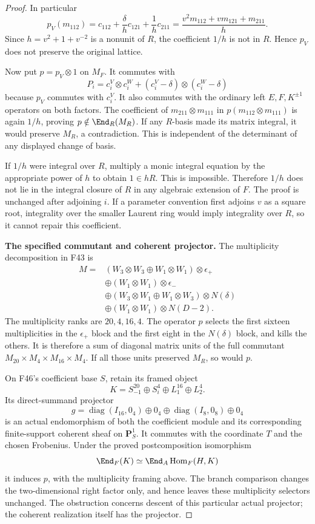 \documentclass[11pt,a4paper]{article}
\newcommand{\fid}[1]{\textsf{#1}}\newcommand{\gate}[1]{\textsf{#1}}
\theoremstyle{named}\newtheorem{finding}{Finding}[section]
\theoremstyle{definition}\newtheorem{definition}[finding]{Definition}
\theoremstyle{remark}\newtheorem{remark}[finding]{Remark}
\begin{document}
\begin{proof}
In particular
\[
 p_V(m_{112})
 =c_{112}+\frac{\delta}{h}c_{121}+\frac1h c_{211}
 =\frac{v^2m_{112}+v m_{121}+m_{211}}h.
\]
Since $h=v^2+1+v^{-2}$ is a nonunit of $R$, the coefficient
$1/h$ is not in $R$. Hence $p_V$ does not preserve the
original lattice.

Now put $p=p_V\otimes1$ on $M_F$. It commutes with
\[
 P_i=c_i^V\otimes c_i^W+
       (c_i^V-\delta)\otimes(c_i^W-\delta)
\]
because $p_V$ commutes with $c_i^V$.
It also commutes with the ordinary left $E,F,K^{\pm1}$
operators on both factors. The coefficient of
$m_{211}\otimes m_{111}$ in
$p(m_{112}\otimes m_{111})$ is again $1/h$, proving
$p\notin\End_R(M_R)$.
If any $R$-basis made its matrix integral, it would preserve
$M_R$, a contradiction. This is independent of the determinant
of any displayed change of basis.

If $1/h$ were integral over $R$, multiply a monic integral
equation by the appropriate power of $h$ to obtain $1\in hR$.
This is impossible. Therefore $1/h$ does not lie in the
integral closure of $R$ in any algebraic extension of $F$.
The proof is unchanged after adjoining $i$.
If a parameter convention first adjoins $v$ as a square root,
integrality over the smaller Laurent ring would imply
integrality over $R$, so it cannot repair this coefficient.

\par\smallskip\noindent\textbf{The specified commutant and coherent projector.}\quad
The multiplicity decomposition in \fid{F43} is
\[
 \begin{aligned}
 M={}&(W_3\otimes W_3\oplus W_1\otimes W_1)\otimes\epsilon_+\\
 &\oplus(W_1\otimes W_1)\otimes\epsilon_-\\
 &\oplus(W_3\otimes W_1\oplus W_1\otimes W_3)\otimes N(\delta)\\
 &\oplus(W_1\otimes W_1)\otimes N(D-2).
 \end{aligned}
\]
The multiplicity ranks are $20,4,16,4$.
The operator $p$ selects the first sixteen multiplicities in
the $\epsilon_+$ block and the first eight in the $N(\delta)$
block, and kills the others. It is therefore a sum of diagonal
matrix units of the full commutant
$M_{20}\times M_4\times M_{16}\times M_4$.
If all those units preserved $M_R$, so would $p$.

On \fid{F46}'s coefficient base $S$, retain its framed object
\[
 K=S_{-1}^{20}\oplus S_i^4\oplus L_1^{16}\oplus L_2^4.
\]
Its direct-summand projector
\[
 g=\operatorname{diag}(I_{16},0_4)\oplus0_4
   \oplus\operatorname{diag}(I_8,0_8)\oplus0_4
\]
is an actual endomorphism of both the coefficient module and
its corresponding finite-support coherent sheaf on $\mathbf P^1_S$.
It commutes with the coordinate $T$ and the chosen Frobenius.
Under the proved postcomposition isomorphism
\[
 \End_F(K)\simeq
 \End_A\operatorname{Hom}_F(H,K)
\]
it induces $p$, with the multiplicity framing above.
The branch comparison changes the two-dimensional right factor
only, and hence leaves these multiplicity selectors unchanged.
The obstruction concerns descent of this particular actual
projector; the coherent realization itself has the projector.


\end{proof}
\end{document}
